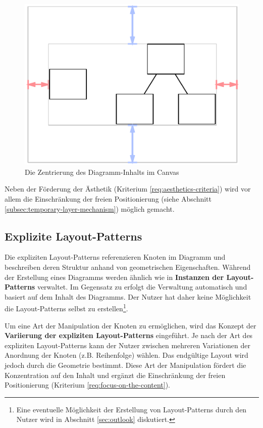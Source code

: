 \begin{figure}[hbt]
    \centering
    \includegraphics{resources/layout-pattern-centered-content}
    \caption{Die Zentrierung des Diagramm-Inhalts im Canvas}
    \label{fig:layout-pattern-centered-content}
\end{figure}

Neben der Förderung der Ästhetik (Kriterium \ref{req:aesthetics-criteria}) wird vor allem die Einschränkung der freien Positionierung (siehe Abschnitt \ref{subsec:temporary-layer-mechanism}) möglich gemacht.

\subsection{Explizite Layout-Patterns}
\label{subsec:explicit-layout-patterns}

Die expliziten Layout-Patterns referenzieren Knoten im Diagramm und beschreiben deren Struktur anhand von geometrischen Eigenschaften. Während der Erstellung eines Diagramms werden ähnlich wie in \cite{Maier12A-Pattern-based} \textbf{Instanzen der Layout-Patterns} verwaltet. Im Gegensatz zu \cite{Maier12A-Pattern-based} erfolgt die Verwaltung automatisch und basiert auf dem Inhalt des Diagramms. Der Nutzer hat daher keine Möglichkeit die Layout-Patterns selbst zu erstellen\footnote{Eine eventuelle Möglichkeit der Erstellung von Layout-Patterns durch den Nutzer wird in Abschnitt \ref{sec:outlook} diskutiert.}.

Um eine Art der Manipulation der Knoten zu ermöglichen, wird das Konzept der \textbf{Variierung der expliziten Layout-Patterns} eingeführt. Je nach der Art des expliziten Layout-Patterns kann der Nutzer zwischen mehreren Variationen der Anordnung der Knoten (z.B. Reihenfolge) wählen. Das endgültige Layout wird jedoch durch die Geometrie bestimmt. Diese Art der Manipulation fördert die Konzentration auf den Inhalt und ergänzt die Einschränkung der freien Positionierung (Kriterium \ref{req:focus-on-the-content}).

